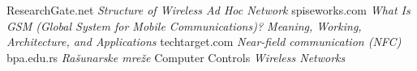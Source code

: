 \documentclass[a4paper]{article}
\begin{document}
\appendix

\begin{thebibliography}{}

 ResearchGate.net \emph{Structure of Wireless Ad Hoc Network}
 spiseworks.com \emph{What Is GSM (Global System for Mobile Communications)? Meaning, Working, Architecture, and Applications} 
 techtarget.com \emph{Near-field communication (NFC)}
 bpa.edu.rs \emph{Rašunarske mreže}
 Computer Controls \emph{Wireless Networks}

\end{thebibliography}
\end{document}
